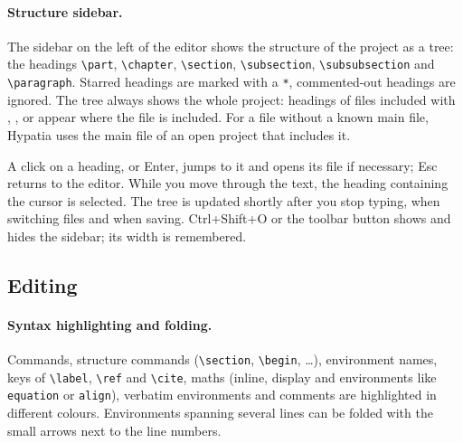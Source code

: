 \documentclass[11pt]{article}
\newcommand{\key}[1]{\textsf{#1}}
\begin{document}
    \paragraph{Structure sidebar.}     The sidebar on the left of the editor shows the structure of the project as a tree: the headings \verb+\part+, \verb+\chapter+, \verb+\section+, \verb+\subsection+, \verb+\subsubsection+ and \verb+\paragraph+. Starred headings are marked with a \verb+*+, commented-out headings are ignored. The tree always shows the whole project: headings of files included with \verb++, \verb++, \verb++ or \verb++ appear where the file is included. For a file without a known main file, Hypatia uses the main file of an open project that includes it.

    A click on a heading, or \key{Enter}, jumps to it and opens its file if necessary; \key{Esc} returns to the editor. While you move through the text, the heading containing the cursor is selected. The tree is updated shortly after you stop typing, when switching files and when saving. \key{Ctrl+Shift+O} or the toolbar button shows and hides the sidebar; its width is remembered.


    \subsection{Editing}

    \paragraph{Syntax highlighting and folding.}     Commands, structure commands (\verb+\section+, \verb+\begin+, \ldots), environment names, keys of \verb+\label+, \verb+\ref+ and \verb+\cite+, maths (inline, display and environments like \verb+equation+ or \verb+align+), verbatim environments and comments are highlighted in different colours. Environments spanning several lines can be folded with the small arrows next to the line numbers.
\end{document}
